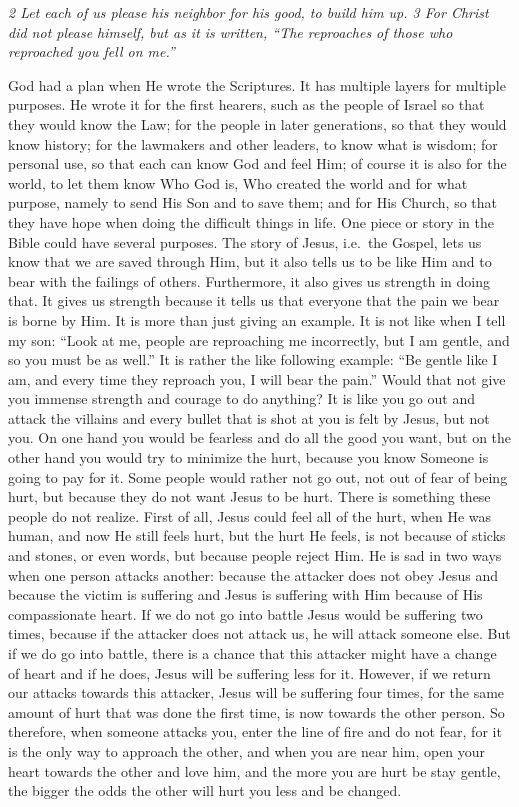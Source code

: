 \emph{2 Let each of us please his neighbor for his good, to build him
up. 3 For Christ did not please himself, but as it is written, ``The
reproaches of those who reproached you fell on me.''}

God had a plan when He wrote the Scriptures. It has multiple layers for
multiple purposes. He wrote it for the first hearers, such as the people
of Israel so that they would know the Law; for the people in later
generations, so that they would know history; for the lawmakers and
other leaders, to know what is wisdom; for personal use, so that each
can know God and feel Him; of course it is also for the world, to let
them know Who God is, Who created the world and for what purpose, namely
to send His Son and to save them; and for His Church, so that they have
hope when doing the difficult things in life. One piece or story in the
Bible could have several purposes. The story of Jesus, i.e.~the Gospel,
lets us know that we are saved through Him, but it also tells us to be
like Him and to bear with the failings of others. Furthermore, it also
gives us strength in doing that. It gives us strength because it tells
us that everyone that the pain we bear is borne by Him. It is more than
just giving an example. It is not like when I tell my son: ``Look at me,
people are reproaching me incorrectly, but I am gentle, and so you must
be as well.'' It is rather the like following example: ``Be gentle like
I am, and every time they reproach you, I will bear the pain.'' Would
that not give you immense strength and courage to do anything? It is
like you go out and attack the villains and every bullet that is shot at
you is felt by Jesus, but not you. On one hand you would be fearless and
do all the good you want, but on the other hand you would try to
minimize the hurt, because you know Someone is going to pay for it. Some
people would rather not go out, not out of fear of being hurt, but
because they do not want Jesus to be hurt. There is something these
people do not realize. First of all, Jesus could feel all of the hurt,
when He was human, and now He still feels hurt, but the hurt He feels,
is not because of sticks and stones, or even words, but because people
reject Him. He is sad in two ways when one person attacks another:
because the attacker does not obey Jesus and because the victim is
suffering and Jesus is suffering with Him because of His compassionate
heart. If we do not go into battle Jesus would be suffering two times,
because if the attacker does not attack us, he will attack someone else.
But if we do go into battle, there is a chance that this attacker might
have a change of heart and if he does, Jesus will be suffering less for
it. However, if we return our attacks towards this attacker, Jesus will
be suffering four times, for the same amount of hurt that was done the
first time, is now towards the other person. So therefore, when someone
attacks you, enter the line of fire and do not fear, for it is the only
way to approach the other, and when you are near him, open your heart
towards the other and love him, and the more you are hurt be stay
gentle, the bigger the odds the other will hurt you less and be changed.

